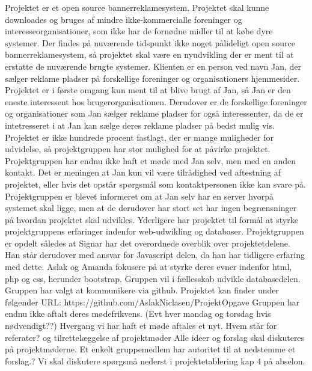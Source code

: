 \documentclass[a4paper,12pt]{article}
\begin{document}
Projektet er et open source bannerreklamesystem. Projektet skal kunne downloades og bruges af mindre ikke-kommercialle foreninger og interesseorganisationer, som ikke har de fornødne midler til at købe dyre systemer. Der findes på nuværende tidspunkt ikke noget pålideligt open source bannerreklamesystem, så projektet skal være en nyudvikling der er ment til at erstatte de nuværende brugte systemer. Klienten er en person ved navn Jan, der sælger reklame pladser på forskellige foreninger og organisationers hjemmesider. Projektet er i første omgang kun ment til at blive brugt af Jan, så Jan er den eneste interessent hos brugerorganisationen. Derudover er de forskellige foreninger og organisationer som Jan sælger reklame pladser for også interessenter, da de er intetresseret i at Jan kan sælge deres reklame pladser på bedst mulig vis. Projektet er ikke hundrede procent fastlagt, der er mange muligheder for udvidelse, så projektgruppen har stor mulighed for at påvirke projektet. Projektgruppen har endnu ikke haft et møde med Jan selv, men med en anden kontakt. Det er meningen at Jan kun vil være tilrådighed ved aftestning af projektet, eller hvis det opstår spørgsmål som kontaktpersonen ikke kan svare på. Projektgruppen er blevet informeret om at Jan selv har en server hvorpå systemet skal ligge, men at de derudover har stort set har ingen begrænsninger på hvordan projektet skal udvikles. 
\newline
Yderligere har projektet til formål at styrke projektgruppens erfaringer indenfor web-udwikling og databaser.
\newline
\newline
Projektgruppen er opdelt således at Signar har det overordnede overblik over projektetdelene. Han står derudover med ansvar for Javascript delen, da han har tidligere erfaring med dette. Aslak og Amanda fokusere på at styrke deres evner indenfor html, php og css, herunder bootstrap. Gruppen vil i fællesskab udvikle databasedelen.
\newline
Gruppen har valgt at kommunikere via github. 
Projektet kan finder under følgender URL: https://github.com/AslakNiclasen/ProjektOpgave 
\newline
\newline 
Gruppen har endnu ikke aftalt deres mødefrikvens. 
(Evt hver mandag og torsdag hvis nødvendigt??)
Hvergang vi har haft et møde aftales et nyt. 
\newline
Hvem står for referater? og tilrettelæggelse af projektmøder
\newline
\newline
Alle ideer og forslag skal diskuteres på projektmøderne. Et enkelt gruppemedlem har autoritet til at nedstemme et forslag.?
Vi skal diskutere spørgsmå nederst i projektetablering kap 4 på abselon.   
\end{document}
